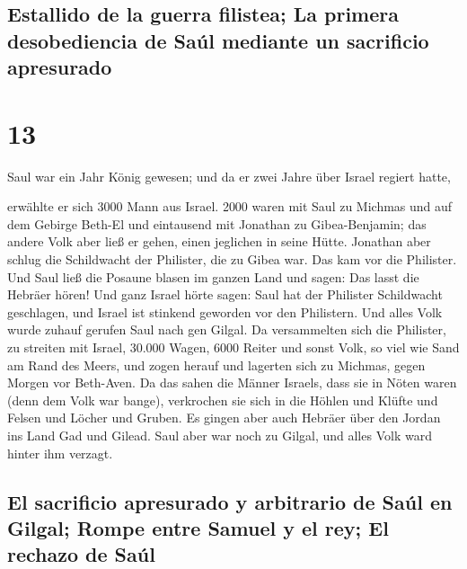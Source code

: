 \hypertarget{estallido-de-la-guerra-filistea-la-primera-desobediencia-de-sauxfal-mediante-un-sacrificio-apresurado}{%
\subsection{Estallido de la guerra filistea; La primera desobediencia de
Saúl mediante un sacrificio
apresurado}\label{estallido-de-la-guerra-filistea-la-primera-desobediencia-de-sauxfal-mediante-un-sacrificio-apresurado}}

\hypertarget{section-12}{%
\section{13}\label{section-12}}

 Saul war ein Jahr König gewesen; und da er zwei Jahre
über Israel regiert hatte,

 erwählte er sich 3000 Mann aus Israel. 2000 waren mit
Saul zu Michmas und auf dem Gebirge Beth-El und eintausend mit Jonathan
zu Gibea-Benjamin; das andere Volk aber ließ er gehen, einen jeglichen
in seine Hütte.  Jonathan aber schlug die Schildwacht der
Philister, die zu Gibea war. Das kam vor die Philister. Und Saul ließ
die Posaune blasen im ganzen Land und sagen: Das lasst die Hebräer
hören!  Und ganz Israel hörte sagen: Saul hat der
Philister Schildwacht geschlagen, und Israel ist stinkend geworden vor
den Philistern. Und alles Volk wurde zuhauf gerufen Saul nach gen
Gilgal.  Da versammelten sich die Philister, zu streiten
mit Israel, 30.000 Wagen, 6000 Reiter und sonst Volk, so viel wie Sand
am Rand des Meers, und zogen herauf und lagerten sich zu Michmas, gegen
Morgen vor Beth-Aven.  Da das sahen die Männer Israels,
dass sie in Nöten waren (denn dem Volk war bange), verkrochen sie sich
in die Höhlen und Klüfte und Felsen und Löcher und Gruben.
 Es gingen aber auch Hebräer über den Jordan ins Land Gad
und Gilead. Saul aber war noch zu Gilgal, und alles Volk ward hinter ihm
verzagt.

\hypertarget{el-sacrificio-apresurado-y-arbitrario-de-sauxfal-en-gilgal-rompe-entre-samuel-y-el-rey-el-rechazo-de-sauxfal}{%
\subsection{El sacrificio apresurado y arbitrario de Saúl en Gilgal;
Rompe entre Samuel y el rey; El rechazo de
Saúl}\label{el-sacrificio-apresurado-y-arbitrario-de-sauxfal-en-gilgal-rompe-entre-samuel-y-el-rey-el-rechazo-de-sauxfal}}

